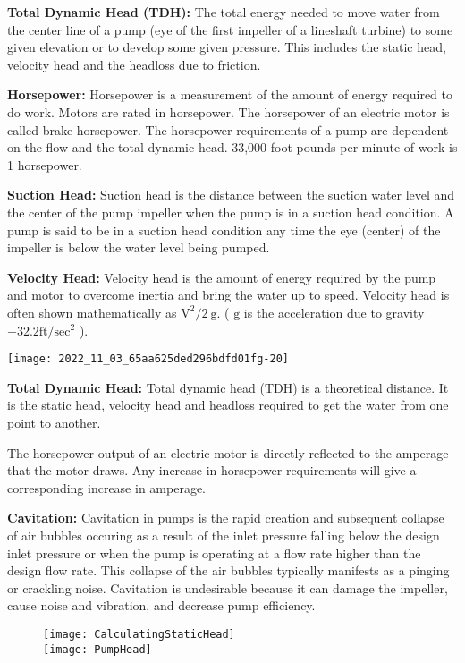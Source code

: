 \textbf{Total Dynamic Head (TDH):}  The total energy needed to move water from the center line of a pump (eye of the first impeller of a lineshaft turbine) to some given elevation or to develop some given pressure. This includes the static head, velocity head and the headloss due to friction. 

\textbf{Horsepower: } Horsepower is a measurement of the amount of energy required to do work. Motors are rated in horsepower. The horsepower of an electric motor is called brake horsepower. The horsepower requirements of a pump are dependent on the flow and the total dynamic head.  33,000 foot pounds per minute of work is 1 horsepower.

\textbf{Suction Head: } Suction head is the distance between the suction water level and the center of the pump impeller when the pump is in a suction head condition. A pump is said to be in a suction head condition any time the eye (center) of the impeller is below the water level being pumped.

\textbf{Velocity Head: } Velocity head is the amount of energy required by the pump and motor to overcome inertia and bring the water up to speed. Velocity head is often shown mathematically as $\mathrm{V}^{2} / 2 \mathrm{~g}$. ( $\mathrm{g}$ is the acceleration due to gravity $-32.2 \mathrm{ft} / \mathrm{sec}^{2}$ ).
\begin{center}
\texttt{[image: 2022\_11\_03\_65aa625ded296bdfd01fg-20]}
\end{center}
\textbf{Total Dynamic Head: }  Total dynamic head (TDH) is a theoretical distance. It is the static head, velocity head and headloss required to get the water from one point to another.

The horsepower output of an electric motor is directly reflected to the amperage that the motor draws. Any increase in horsepower requirements will give a corresponding increase in amperage.

\textbf{Cavitation: }  Cavitation in pumps is the rapid creation and subsequent collapse of air bubbles occuring as a result of the inlet pressure falling below the design inlet pressure or when the pump is operating at a flow rate higher than the design flow rate. This collapse of the air bubbles typically manifests as a pinging or crackling noise.  Cavitation is undesirable because it can damage the impeller, cause noise and vibration, and decrease pump efficiency.

\begin{figure}[h]
\begin{center}
\texttt{[image: CalculatingStaticHead]}\\
\texttt{[image: PumpHead]}\\
\end{center}
\end{figure}

